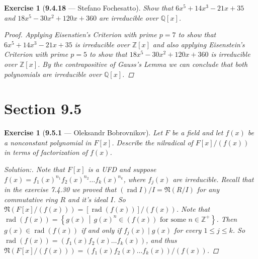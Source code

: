 \documentclass[12pt]{amsart}
\newtheorem{exercise}[theorem]{Exercise}
\theoremstyle{remark}
\newcommand{\ZZ}{{\mathbb Z}}
\newcommand{\QQ}{{\mathbb Q}}
\theoremstyle{mycomment}
\def\midd{\,\middle\vert\, }
\begin{document}
\begin{exercise}[\textbf{9.4.18} --- Stefano Fochesatto] Show that $6x^5 + 14x^3 - 21x + 35$ and $18x^5 - 30x^2 + 120x + 360$ are 
  irreducible over $\QQ[x]$.
  \begin{proof}
    Applying Eisenstien's Criterion with prime $p = 7$ to show that $6x^5 + 14x^3 - 21x + 35$ is irreducible over $\ZZ[x]$ and also applying Eisenstein's Criterion with prime $p = 5$ to show that $18x^5 - 30x^2 + 120x + 360$ is irreducible 
    over $\ZZ[x]$. By the contrapositive of Gauss's Lemma we can conclude that both polynomials are irreducible over $\QQ[x]$.
  \end{proof}
  \end{exercise}
  \vspace{.5in}
  





\section*{Section 9.5}
\begin{exercise}[\textbf{9.5.1} --- Oleksandr Bobrovnikov]
  \def\rad{\operatorname{rad}}
  \def\Nil{\mathfrak N}
  Let $F$ be a field and let $f(x)$ be a nonconstant polynomial  in $F[x]$. Describe the nilradical of $F[x]/(f(x))$ in terms of factorization of $f(x)$.
  \begin{proof}[Solution:]
    Note that $F[x]$ is a UFD and suppose $f(x)=f_1(x)^{n_1}f_2(x)^{n_2}\dots f_k(x)^{n_k}$, where $f_j(x)$ are irreducible.
    Recall that in the exercise 7.4.30 we proved that  $(\rad I)/I=\Nil (R/I)$ for any commutative ring $R$ and it's ideal $I$. So $\Nil (F[x]/(f(x)))=[\rad (f(x))]/(f(x))$.
    Note that $\rad (f(x))=\left\{ g(x)\midd g(x)^n \in (f(x))\text{ for some }n \in \ZZ^+ \right\}$. Then $g(x)\in\rad (f(x))$ if and only if $f_j(x)\mid g(x)$ for every $1\leq j\leq k$. So $\rad(f(x))=(f_1(x)f_2(x)\dots f_k(x))$, and thus
    $\Nil (F[x]/(f(x)))=(f_1(x)f_2(x)\dots f_k(x))/(f(x))$.
  \end{proof}
\end{exercise}
\vspace{.5in}
\end{document}
